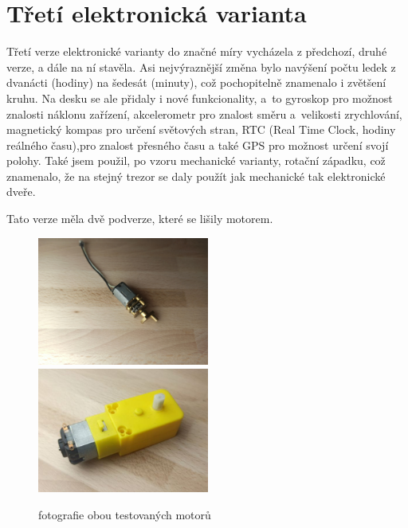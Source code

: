 \section{Třetí elektronická varianta}


Třetí verze elektronické varianty do značné míry vycházela z předchozí, druhé verze, a dále na ní stavěla. Asi nejvýraznější změna bylo navýšení počtu 
ledek z dvanácti (hodiny) na šedesát (minuty), což pochopitelně znamenalo i zvětšení kruhu. Na desku se ale přidaly i nové funkcionality,
a~to gyroskop pro možnost znalosti náklonu zařízení, akcelerometr pro znalost směru a~velikosti zrychlování, magnetický kompas pro určení světových
stran, RTC (Real Time Clock, hodiny reálného času),pro znalost přesného času a také GPS pro možnost určení svojí polohy.
Také jsem použil, po vzoru mechanické varianty, rotační západku, což znamenalo, že na stejný trezor se daly použít jak mechanické tak 
elektronické dveře.

Tato verze měla dvě podverze, které se lišily motorem.
\begin{figure}[htbp]
    \centering
    \includegraphics[width=160pt]{kapitoly/obrazky/E3/motory/hodinovyStrojek.jpg}
    \includegraphics[width=160pt]{kapitoly/obrazky/E3/motory/zluty_motor.jpg}
    \caption{fotografie obou testovaných motorů} 
    \label{fig:E3-motory}
\end{figure}

